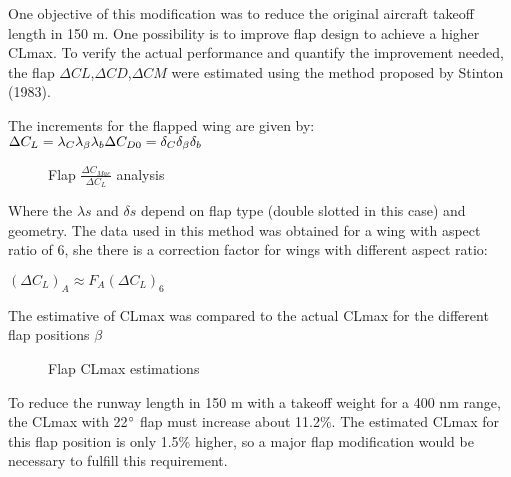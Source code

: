 One objective of this modification was to reduce the original aircraft takeoff length in 150 m. One possibility is to improve flap design to achieve a higher CLmax. To verify the actual performance and quantify the improvement needed, the flap $\Delta CL$,$\Delta CD$,$\Delta CM$ were estimated using the method proposed by Stinton (1983).

The increments for the flapped wing are given by:
                    $
                    \\\Delta C_{L}=\lambda_{C} \lambda_{\beta} \lambda_{b}
                    \\\Delta C_{D0}=\delta_{C} \delta_{\beta} \delta_{b}
                    $



\begin{figure}[H] %
\caption{Flap $\frac{ \Delta C_{Mac}}{ \Delta C_{L}}  $ analysis}
\label{fig:flap-CmCl}
\end{figure}

Where the $\lambda s$ and $\delta s$ depend on flap type (double slotted in this case) and geometry.
The data used in this method was obtained for a wing with aspect ratio of 6, she there is a correction factor for wings with different aspect ratio:

                        $  (\Delta C_{L} )_{A} \approx F_{A} ( \Delta C_{L} )_{6}         $

The estimative of CLmax was compared to the actual CLmax for the different flap positions $\beta$

\begin{figure}[H] %
\caption{Flap CLmax estimations}
\label{fig:FlapCLmaxestimations}
\end{figure}

To reduce the runway length in 150 m with a takeoff weight for a 400 nm range, the CLmax with 22$\degree$ flap must increase about 11.2\%. The estimated CLmax for this flap position is only 1.5\% higher, so a major flap modification would be necessary to fulfill this requirement.

